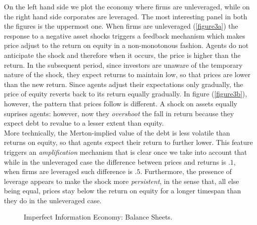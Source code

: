 \documentclass[11pt]{article}
\begin{document}
On the left hand side we plot the economy where firms are unleveraged, while on the right hand side corporates are leveraged. The most interesting panel in both the figures is the uppermost one. When firms are unleveraged (\ref{figure3a}) the response to a negative asset shocks triggers a feedback mechanism which makes price adjust to the return on equity in a non-monotonous fashion. Agents do not anticipate the shock and therefore when it occurs, the price is higher than the return. In the subsequent period, since investors are unaware of the temporary nature of the shock, they expect returns to maintain low, so that prices are lower than the new return. Since agents adjust their expectations only gradually, the price of equity reverts back to its return equally gradually. In figure (\ref{figure3b}), however, the pattern that prices follow is different. A shock on assets equally suprises agents: however, now they \emph{overshoot} the fall in return because they expect debt to revalue to a lesser extent than equity. \\More technically, the Merton-implied value of the debt is less volatile than returns on equity, so that agents expect their return to further lower. This feature triggers an \emph{amplification} mechanism that is clear once we take into account that while in the unleveraged case the difference between prices and returns is $.1$, when firms are leveraged such difference is $.5$. Furthermore, the presence of leverage appears to make the shock more \emph{persistent}, in the sense that, all else being equal, prices stay below the return on equity for a longer timespan than they do in the unleveraged case.
\begin{figure}[h!]
\centering
{}\quad
{}
 \caption{Imperfect Information Economy: Balance Sheets.} \label{figure4}
\end{figure}\\
\end{document}
